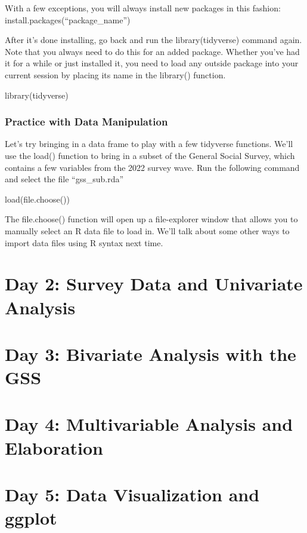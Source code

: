 \documentclass[
  letterpaper,
  DIV=11,
  numbers=noendperiod]{scrreprt}
\newenvironment{Shaded}{\begin{snugshade}}{\end{snugshade}}
\newcommand{\FunctionTok}[1]{\textcolor[rgb]{0.28,0.35,0.67}{#1}}
\newcommand{\NormalTok}[1]{\textcolor[rgb]{0.00,0.23,0.31}{#1}}
\begin{document}
With a few exceptions, you will always install new packages in this
fashion: install.packages(``package\_name'')

After it's done installing, go back and run the library(tidyverse)
command again. Note that you always need to do this for an added
package. Whether you've had it for a while or just installed it, you
need to load any outside package into your current session by placing
its name in the library() function.

\begin{Shaded}
\begin{Highlighting}[]
\FunctionTok{library}\NormalTok{(tidyverse)}
\end{Highlighting}
\end{Shaded}

\section{Practice with Data
Manipulation}\label{practice-with-data-manipulation}

Let's try bringing in a data frame to play with a few tidyverse
functions. We'll use the load() function to bring in a subset of the
General Social Survey, which contains a few variables from the 2022
survey wave. Run the following command and select the file
``gss\_sub.rda''

\begin{Shaded}
\begin{Highlighting}[]
\FunctionTok{load}\NormalTok{(}\FunctionTok{file.choose}\NormalTok{())}
\end{Highlighting}
\end{Shaded}

The file.choose() function will open up a file-explorer window that
allows you to manually select an R data file to load in. We'll talk
about some other ways to import data files using R syntax next time.

\part{Day 2: Survey Data and Univariate Analysis}

\part{Day 3: Bivariate Analysis with the GSS}

\part{Day 4: Multivariable Analysis and Elaboration}

\part{Day 5: Data Visualization and ggplot}
\end{document}
